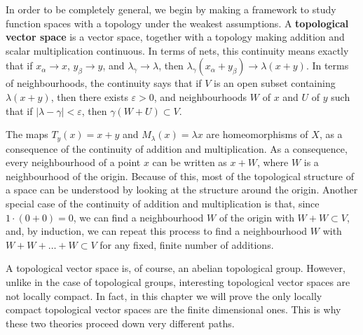 In order to be completely general, we begin by making a framework to study function spaces with a topology under the weakest assumptions. A {\bf topological vector space} is a vector space, together with a topology making addition and scalar multiplication continuous. In terms of nets, this continuity means exactly that if $x_\alpha \to x$, $y_\beta \to y$, and $\lambda_\gamma \to \lambda$, then $\lambda_\gamma (x_\alpha + y_\beta) \to \lambda (x + y)$. In terms of neighbourhoods, the continuity says that if $V$ is an open subset containing $\lambda(x + y)$, then there exists $\varepsilon > 0$, and neighbourhoods $W$ of $x$ and $U$ of $y$ such that if $|\lambda - \gamma| < \varepsilon$, then $\gamma(W + U) \subset V$.

The maps $T_y(x) = x + y$ and $M_\lambda(x) = \lambda x$ are homeomorphisms of $X$, as a consequence of the continuity of addition and multiplication. As a consequence, every neighbourhood of a point $x$ can be written as $x + W$, where $W$ is a neighbourhood of the origin. Because of this, most of the topological structure of a space can be understood by looking at the structure around the origin. Another special case of the continuity of addition and multiplication is that, since $1 \cdot (0 + 0) = 0$, we can find a neighbourhood $W$ of the origin with $W + W \subset V$, and, by induction, we can repeat this process to find a neighbourhood $W$ with $W + W + \dots + W \subset V$ for any fixed, finite number of additions.

\begin{remark}
    A topological vector space is, of course, an abelian topological group. However, unlike in the case of topological groups, interesting topological vector spaces are not locally compact. In fact, in this chapter we will prove the only locally compact topological vector spaces are the finite dimensional ones. This is why these two theories proceed down very different paths.
\end{remark}

%
%

